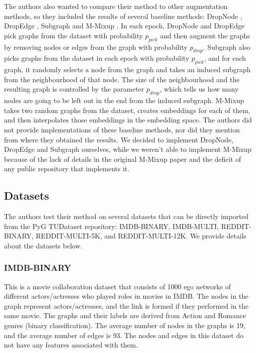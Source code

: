 The authors also wanted to compare their method to other augmentation methods, so they included the results of several baseline methods: DropNode \cite{rong2019dropedge}, DropEdge \cite{rong2019dropedge}, Subgraph \cite{you2020graph} and M-Mixup \cite{wang2021mixup}. In each epoch, DropNode and DropEdge pick graphs from the dataset with probability $p_{pick}$ and then augment the graphs by removing nodes or edges from the graph with probability $p_{drop}$. Subgraph also picks graphs from the dataset in each epoch with probability $p_{pick}$, and for each graph, it randomly selects a node from the graph and takes an induced subgraph from the neighbourhood of that node. The size of the neighbourhood and the resulting graph is controlled by the parameter $p_{drop}$, which tells us how many nodes are going to be left out in the end from the induced subgraph. M-Mixup takes two random graphs from the dataset, creates embeddings for each of them, and then interpolates those embeddings in the embedding space. The authors did not provide implementations of these baseline methods, nor did they mention from where they obtained the results. We decided to implement DropNode, DropEdge and Subgraph ourselves, while we weren't able to implement M-Mixup because of the lack of details in the original M-Mixup paper and the deficit of any public repository that implements it. 

\subsection{Datasets}

The authors test their method on several datasets that can be directly imported from the PyG TUDataset \cite{morris2020tudataset} repository: IMDB-BINARY, IMDB-MULTI, REDDIT-BINARY, REDDIT-MULTI-5K, and REDDIT-MULTI-12K. We provide details about the datasets below.

\subsubsection{IMDB-BINARY} This is a movie collaboration dataset that consists of 1000 ego networks of different actors/actresses who played roles in movies in IMDB. The nodes in the graph represent actors/actresses, and the link is formed if they performed in the same movie. The graphs and their labels are derived from Action and Romance genres (binary classification). The average number of nodes in the graphs is 19, and the average number of edges is 93. The nodes and edges in this dataset do not have any features associated with them.

